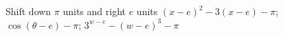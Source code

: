 {Shift down $\pi$ units and right $e$ units}
{$(x-e)^2-3(x-e) - \pi$; $\cos{(\theta-e)} - \pi$; $3^{w-e} - (w-e)^3 - \pi$}
